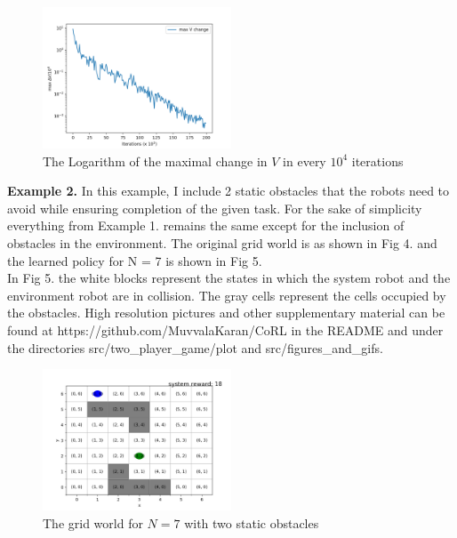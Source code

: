\documentclass[letterpaper, 10 pt, conference]{ieeeconf}  %
\begin{document}
\begin{figure}[b]
    \centering
    \includegraphics[width=0.5\textwidth]{images/max del_V_per_10k_N_6.png}
    \caption{The Logarithm of the maximal change in $V$ in every $10^4$ iterations}
\label{fig:max del(v) N 6}
\end{figure}

\textbf{Example 2.} In this example, I include 2 static obstacles that the robots need to avoid while ensuring completion of the given task. For the sake of simplicity everything from Example 1. remains the same except for the inclusion of obstacles in the environment. The original grid world is as shown in Fig 4.  and the learned policy for N = 7 is shown in Fig 5. \\

In Fig 5. the white blocks represent the states in which the system robot and the environment robot are in collision. The gray cells represent the cells occupied by the obstacles. High resolution pictures and other supplementary material can be found at https://github.com/MuvvalaKaran/CoRL in the README and under the directories src/two\_player\_game/plot and src/figures\_and\_gifs.


\begin{figure}[t]
    \centering
    \includegraphics[width=0.5\textwidth]{images/N_7_grid_world.jpg}
    \caption{The grid world for $N= 7$ with two static obstacles}
\label{fig:N 7 grid world}
\end{figure}
\end{document}
